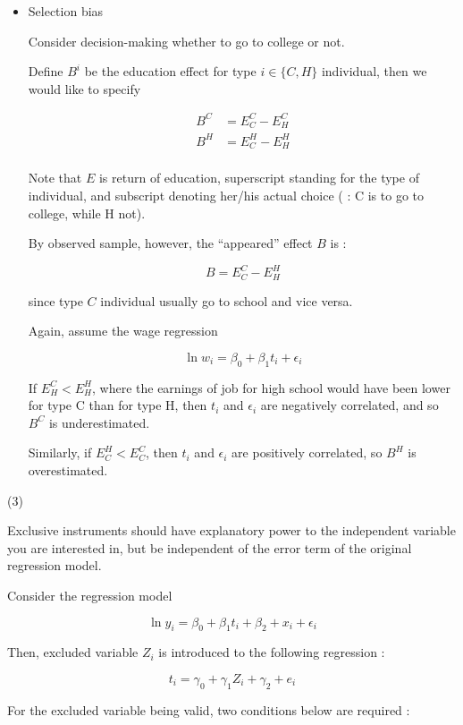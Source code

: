 \documentclass{jsarticle}
\begin{document}
\begin{enumerate}
\begin{itemize}
  \item Selection bias
  
  Consider decision-making whether to go to college or not.
  
  Define $B^i$ be the education effect for type $i \in \{ C, H \}$ individual, then we would like to specify
  
   \begin{align*}
   B^C &= E_C^C - E_H^C \\
   B^H &= E_C^H - E_H^H \\
   \end{align*}
  
  Note that $E$ is return of education, superscript standing for the type of individual, and subscript denoting her/his actual choice ( : C is to go to college, while H not).
  
  By observed sample, however, the ``appeared'' effect $B$ is :
  
  \[ B = E_C^C - E_H^H \]
  
  since type $C$ individual usually go to school and vice versa.
  
  Again, assume the wage regression
  
  \[ \ln w_i = \beta_0 + \beta_1 t_i + \epsilon_i \]
  
  If $E_H^C < E_H^H$, where the earnings of job for high school would have been lower for type C than for type H, then $t_i$ and $\epsilon_i$ are negatively correlated, and so $B^C$ is underestimated.
  
  Similarly, if $E_C^H < E_C^C$, then $t_i$ and $\epsilon_i$ are positively correlated, so $B^H$ is overestimated.
  
  \end{itemize}
 
 (3)
 
 Exclusive instruments should have explanatory power to the independent variable you are interested in, but be independent of the error term of the original regression model.
 
 Consider the regression model
 
 \[ \ln y_i = \beta_0 + \beta_1 t_i + \beta_2 + x_i + \epsilon_i \]
 
 Then, excluded variable $Z_i$ is introduced to the following regression :
 
 \[t_i = \gamma_0 + \gamma_1 Z_i + \gamma_2 + e_i \]
 
 For the excluded variable being valid, two conditions below are required :
 

\end{enumerate}
\end{document}
